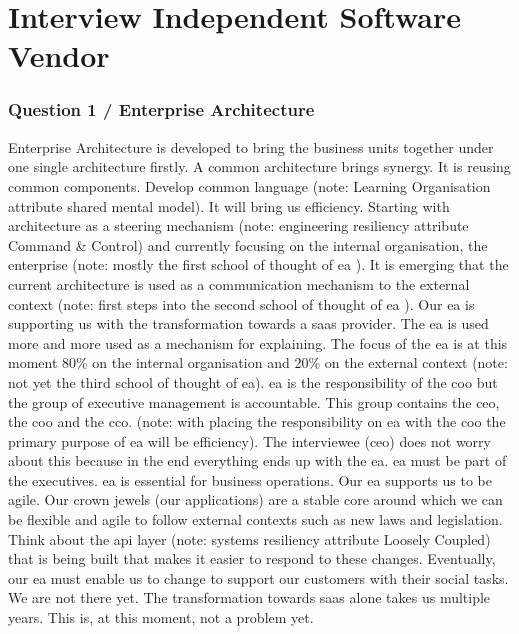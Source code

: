 \section{Interview Independent Software Vendor}
\label{sec:interviewisv}
\subsubsection{Question 1 / Enterprise Architecture}
Enterprise Architecture is developed to bring the business units together under one single architecture firstly. A common architecture brings synergy. It is reusing common components. Develop common language (note: Learning Organisation attribute shared mental model). It will bring us efficiency. Starting with architecture as a steering mechanism (note: engineering \gls{resiliency} attribute Command \& Control) and currently focusing on the internal organisation, the enterprise (note: mostly the first school of thought of \gls{ea} \parencite{Lapalme2012}). It is emerging that the current architecture is used as a communication mechanism to the external context (note: first steps into the second school of thought of \gls{ea} \parencite{Lapalme2012}). Our \gls{ea} is supporting us with the transformation towards a \acrfull{saas} provider. The \gls{ea} is used more and more used as a mechanism for explaining. The focus of the \gls{ea} is at this moment 80\% on the internal organisation and 20\% on the external context (note: not yet the third school of thought of \gls{ea}).
\gls{ea} is the responsibility of the \acrfull{coo} but the group of executive management is accountable. This group contains the \acrfull{ceo}, the \acrshort{coo} and the \acrfull{cco}. (note: with placing the responsibility on \gls{ea} with the \acrshort{coo} the primary purpose of \gls{ea} will be efficiency). The interviewee (\acrshort{ceo}) does not worry about this because in the end everything ends up with the \gls{ea}. \gls{ea} must be part of the executives. \gls{ea} is essential for business operations.
Our \gls{ea} supports us to be agile. Our crown jewels (our applications) are a stable core around which we can be flexible and agile to follow external contexts such as new laws and legislation. Think about the \acrfull{api} layer (note: systems \gls{resiliency} attribute Loosely Coupled) that is being built that makes it easier to respond to these changes. Eventually, our \gls{ea} must enable us to change to support our customers with their social tasks. We are not there yet. The transformation towards \acrfull{saas} alone takes us multiple years. This is, at this moment, not a problem yet.
